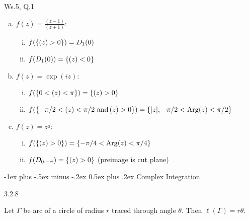 \documentclass[10pt,landscape]{article}
\makeatletter
\DeclareMathOperator{\Arg}{Arg}
\let\Re\relax
\DeclareMathOperator{\Re}{Re}
\let\Im\relax
\DeclareMathOperator{\Im}{Im}
\renewcommand{\section}{\@startsection{section}{1}{0mm}%
                                {-1ex plus -.5ex minus -.2ex}%
                                {0.5ex plus .2ex}%
                                {\normalfont\large\bfseries}}
\makeatother
\begin{document}
\begin{multicols}{3}
\begin{question}{Ws.5, Q.1}{}
    \begin{enumerate}[(a)]
        \setlength{\parskip}{0em}

        \item $\displaystyle f(z) = \frac{(z-1)}{(z+1)}$:

            \begin{enumerate}[(i)]
                \setlength{\parskip}{0em}
                \item $f(\{\Re(z) > 0\}) = D_1(0)$
                \item $f(D_1(0)) = \{\Re(z) < 0\}$
            \end{enumerate}

        \item $f(z) = \exp(iz)$:

            \begin{enumerate}[(i)]
                \setlength{\parskip}{0em}
                \item $f(\{0 < \Re(z) < \pi\}) =  \{\Im(z) > 0\}$
                \item $f(\{-\pi/2 < \Re(z) < \pi/2 \,\,\mathrm{and}\, \Im(z) > 0\}) = \{|z|, -\pi/2 < \Arg(z) < \pi/2\}$
            \end{enumerate}

        \item $f(z) = z^{\frac{1}{2}}$:

            \begin{enumerate}[(i)]
                \setlength{\parskip}{0em}
                \item $f(\{\Re(z) > 0\}) = \{-\pi/4 < \Arg(z) < \pi/4\}$
                \item $f(D_{0,-\pi}) = \{\Re(z) > 0\}$ (preimage is cut plane)
            \end{enumerate}

    \end{enumerate}

\end{question}


\section{Complex Integration}

\begin{lemma}{3.2.8}{}

    Let $\Gamma$ be arc of a circle of radius $r$ traced through angle $\theta$. Then $\ell(\Gamma) = r \theta$.


\end{lemma}
\end{multicols}
\end{document}
